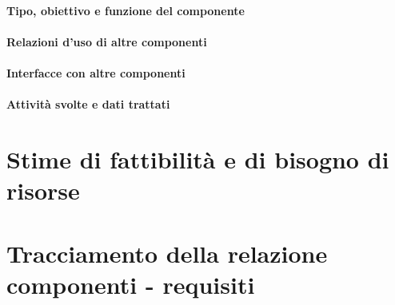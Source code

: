 \subsubsection*{Tipo, obiettivo e funzione del componente}
\subsubsection*{Relazioni d'uso di altre componenti}
\subsubsection*{Interfacce con altre componenti}
\subsubsection*{Attivit\`a svolte e dati trattati}

\chapter{Stime di fattibilit\`a e di bisogno di risorse}

\chapter{Tracciamento della relazione componenti - requisiti}

\listoftables
{}
\listoffigures
{}

